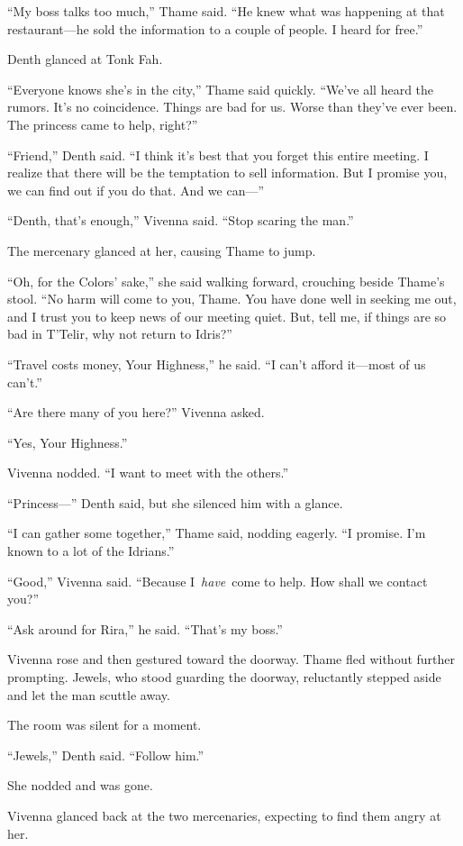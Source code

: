 “My boss talks too much,” Thame said. “He knew what was happening at that restaurant—he sold the information to a couple of people. I heard for free.”

Denth glanced at Tonk Fah.

“Everyone knows she’s in the city,” Thame said quickly. “We’ve all heard the rumors. It’s no coincidence. Things are bad for us. Worse than they’ve ever been. The princess came to help, right?”

“Friend,” Denth said. “I think it’s best that you forget this entire meeting. I realize that there will be the temptation to sell information. But I promise you, we can find out if you do that. And we can—”

“Denth, that’s enough,” Vivenna said. “Stop scaring the man.”

The mercenary glanced at her, causing Thame to jump.

“Oh, for the Colors’ sake,” she said walking forward, crouching beside Thame’s stool. “No harm will come to you, Thame. You have done well in seeking me out, and I trust you to keep news of our meeting quiet. But, tell me, if things are so bad in T’Telir, why not return to Idris?”

“Travel costs money, Your Highness,” he said. “I can’t afford it—most of us can’t.”

“Are there many of you here?” Vivenna asked.

“Yes, Your Highness.”

Vivenna nodded. “I want to meet with the others.”

“Princess—” Denth said, but she silenced him with a glance.

“I can gather some together,” Thame said, nodding eagerly. “I promise. I’m known to a lot of the Idrians.”

“Good,” Vivenna said. “Because I~\textit{have}~come to help. How shall we contact you?”

“Ask around for Rira,” he said. “That’s my boss.”

Vivenna rose and then gestured toward the doorway. Thame fled without further prompting. Jewels, who stood guarding the doorway, reluctantly stepped aside and let the man scuttle away.

The room was silent for a moment.

“Jewels,” Denth said. “Follow him.”

She nodded and was gone.

Vivenna glanced back at the two mercenaries, expecting to find them angry at her.

